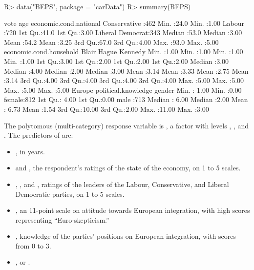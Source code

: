 \documentclass[
]{jss}
\providecommand{\tightlist}{%
  \setlength{\itemsep}{0pt}\setlength{\parskip}{0pt}}
\begin{document}
\begin{CodeChunk}
\begin{CodeInput}
R> data("BEPS", package = "carData")
R> summary(BEPS)
\end{CodeInput}
\begin{CodeOutput}
               vote          age       economic.cond.national
 Conservative    :462   Min.   :24.0   Min.   :1.00
 Labour          :720   1st Qu.:41.0   1st Qu.:3.00
 Liberal Democrat:343   Median :53.0   Median :3.00
                        Mean   :54.2   Mean   :3.25
                        3rd Qu.:67.0   3rd Qu.:4.00
                        Max.   :93.0   Max.   :5.00
 economic.cond.household     Blair          Hague         Kennedy
 Min.   :1.00            Min.   :1.00   Min.   :1.00   Min.   :1.00
 1st Qu.:3.00            1st Qu.:2.00   1st Qu.:2.00   1st Qu.:2.00
 Median :3.00            Median :4.00   Median :2.00   Median :3.00
 Mean   :3.14            Mean   :3.33   Mean   :2.75   Mean   :3.14
 3rd Qu.:4.00            3rd Qu.:4.00   3rd Qu.:4.00   3rd Qu.:4.00
 Max.   :5.00            Max.   :5.00   Max.   :5.00   Max.   :5.00
     Europe      political.knowledge    gender
 Min.   : 1.00   Min.   :0.00        female:812
 1st Qu.: 4.00   1st Qu.:0.00        male  :713
 Median : 6.00   Median :2.00
 Mean   : 6.73   Mean   :1.54
 3rd Qu.:10.00   3rd Qu.:2.00
 Max.   :11.00   Max.   :3.00
\end{CodeOutput}
\end{CodeChunk}

The polytomous (multi-category) response variable is , a
factor with levels , , and
. The predictors of  are:

\begin{itemize}
\tightlist
\item
  , in years.
\item
   and , the
  respondent's ratings of the state of the economy, on 1 to 5 scales.
\item
  , , and , ratings of the leaders
  of the Labour, Conservative, and Liberal Democratic parties, on 1 to 5
  scales.
\item
  , an 11-point scale on attitude towards European
  integration, with high scores representing ``Euro-skepticism.''
\item
  , knowledge of the parties' positions on
  European integration, with scores from 0 to 3.
\item
  ,  or .
\end{itemize}
\end{document}
